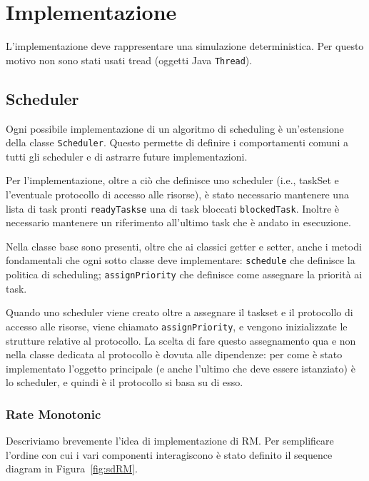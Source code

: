 \chapter{Implementazione}

L'implementazione deve rappresentare una simulazione deterministica. Per questo motivo non sono stati usati tread (oggetti Java \texttt{Thread}).

\section{Scheduler}
Ogni possibile implementazione di un algoritmo di scheduling è un'estensione della classe \texttt{Scheduler}. Questo permette di definire i comportamenti comuni a tutti gli scheduler e di astrarre future implementazioni.

Per l'implementazione, oltre a ciò che definisce uno scheduler (i.e., taskSet e l'eventuale protocollo di accesso alle risorse), è stato necessario mantenere una lista di task pronti \texttt{readyTaskse} una di task bloccati \texttt{blockedTask}. Inoltre è necessario mantenere un riferimento all'ultimo task che è andato in esecuzione.

\myskip

Nella classe base sono presenti, oltre che ai classici getter e setter, anche i metodi fondamentali che ogni sotto classe deve implementare: \texttt{schedule} che definisce la politica di scheduling; \texttt{assignPriority} che definisce come assegnare la priorità ai task.

Quando uno scheduler viene creato oltre a assegnare il taskset e il protocollo di accesso alle risorse, viene chiamato \texttt{assignPriority}, e vengono inizializzate le strutture relative al protocollo. La scelta di fare questo assegnamento qua e non nella classe dedicata al protocollo è dovuta alle dipendenze: per come è stato implementato l'oggetto principale (e anche l'ultimo che deve essere istanziato) è lo scheduler, e quindi è il protocollo si basa su di esso.

\subsection{Rate Monotonic}
Descriviamo brevemente l'idea di implementazione di RM. Per semplificare l'ordine con cui i vari componenti interagiscono è stato definito il sequence diagram in Figura~\ref{fig:sdRM}.

